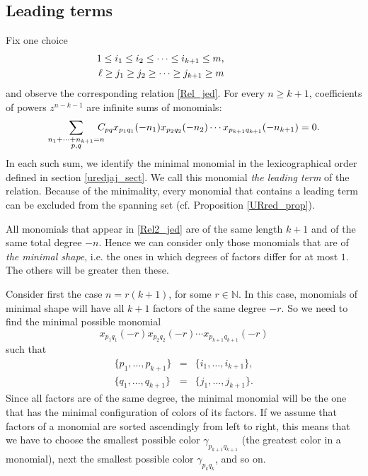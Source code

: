 \documentclass[a4paper, 10pt,oneside]{amsart}
\begin{document}
\subsection{Leading terms}

Fix one choice
\begin{eqnarray*}
& & \hspace{-2cm} 1\leq
i_1 \leq i_2\leq\dots\leq i_{k+1}\leq m, \\
& & \hspace{-2cm} \ell\geq j_1 \geq j_2\geq\dots\geq j_{k+1}\geq m
\end{eqnarray*}
and observe the corresponding relation \eqref{Rel_jed}. For every
$n\geq k+1$, coefficients of powers $z^{n-k-1}$ are infinite sums of
monomials: \begin{equation} \sum_{\substack{n_1+\dots+n_{k+1}=n\\
p,q}} \hspace{-2ex}C_{pq} x_{p_1 q_1}(-n_1)x_{p_2 q_2}(-n_2)\cdots
x_{p_{k+1} q_{k+1}}(-n_{k+1})=0. \label{Rel2_jed}\end{equation} In
each such sum, we identify the minimal monomial in the lexicographical
order defined in section \ref{uredjaj_sect}. We call this monomial \emph{the leading
term} of the relation. Because of the minimality, every monomial
that contains a leading term can be excluded from the spanning set
(cf. Proposition \ref{URred_prop}).

All monomials that appear in \eqref{Rel2_jed} are of the same length
$k+1$ and of the same total degree $-n$. Hence we can consider only
those monomials that are of {\em the minimal shape}, i.e. the ones in which
degrees of factors differ for at most $1$. The others will
be greater then these.

Consider first the case $n=r(k+1)$, for some $r\in{{\mathbb N}}$. In this case,
monomials of minimal shape will have all $k+1$ factors of the same
degree $-r$. So we need to find the minimal possible monomial
$$x_{p_1 q_1}(-r)x_{p_2 q_2}(-r)\cdots x_{p_{k+1}
q_{k+1}}(-r)$$
such that
\begin{eqnarray*}
\{p_1,\dots,p_{k+1}\} & = & \{i_1,\dots,i_{k+1}\},\\
\{q_1,\dots,q_{k+1}\}& = & \{j_1,\dots,j_{k+1}\}.\end{eqnarray*} Since
all factors are of the same degree, the minimal monomial will be
the one that has the minimal configuration of colors of its factors.
If we assume that factors of a monomial are sorted ascendingly
from left to right, this means that we have to choose the smallest
possible color $\gamma_{p_{k+1} q_{k+1}}$ (the greatest color in
a monomial), next the smallest possible color $\gamma_{p_{k} q_{k}}$,
and so on.
\end{document}
